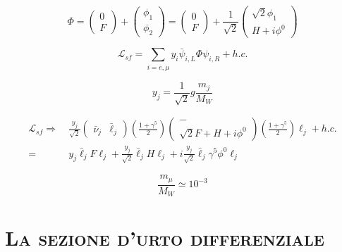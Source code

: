 \documentclass[11pt]{article}
\begin{document}
    \begin{equation}
    \Phi=\begin{pmatrix}0 \\F\end{pmatrix}+\begin{pmatrix}\phi_1 \\\phi_2\end{pmatrix}=\begin{pmatrix}0\\F\end{pmatrix}+\frac{1}{\sqrt{2}}\begin{pmatrix}\sqrt{2}\phi_1 \\H+i\phi^0\end{pmatrix}
    \end{equation}

    \begin{equation}
    \mathcal{L}_{sf}=\sum_{i=e,\mu}y_i\bar{\psi}_{i,L}\Phi\psi_{i,R}+h.c.
    \end{equation}

    \begin{equation}
    y_j=\frac{1}{\sqrt{2}}g\frac{m_j}{M_W}
    \end{equation}

    \begin{equation}
    \begin{split}
    \mathcal{L}_{sf}\Longrightarrow\ &\frac{y_j}{\sqrt{2}}\begin{pmatrix}\bar{\nu}_{j} & \bar{\ell}_{j}\end{pmatrix}\left(\frac{1+\gamma^5}{2}\right)\begin{pmatrix}-\\ \sqrt{2}F+H+i\phi^0\end{pmatrix}\left(\frac{1+\gamma^5}{2}\right)\ell_j+h.c.\\
    =&y_j\bar{\ell}_jF\ell_j+\frac{y_j}{\sqrt{2}}\bar{\ell}_j H \ell_j+i\frac{y_j}{\sqrt{2}}\bar{\ell}_j \gamma^5\phi^0 \ell_j
    \end{split}
    \end{equation}

    \begin{equation}
    \frac{m_{\mu}}{M_W}\simeq 10^{-3}
    \end{equation}


    \section{\centering\textsc{La sezione d'urto differenziale} } %
\end{document}
